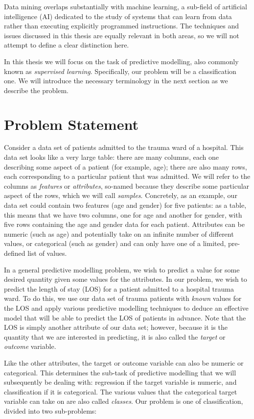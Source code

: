 Data mining overlaps substantially with machine learning, a sub-field of
artificial intelligence (AI) dedicated to the study of systems that can learn
from data rather than executing explicitly programmed instructions. The
techniques and issues discussed in this thesis are equally relevant in both
areas, so we will not attempt to define a clear distinction here.

In this thesis we will focus on the task of predictive modelling, also
commonly known as \textit{supervised learning}. Specifically,
our problem will be a classification one. We will introduce the necessary
terminology in the next section as we describe the problem.

\section{Problem Statement}
Consider a data set of patients admitted to the trauma ward of a hospital.
This data set looks like a very large table: there are many columns, each one
describing some aspect of a patient (for example, age); there are also many
rows, each corresponding to a particular patient that was admitted. We will
refer to the columns as \textit{features} or \textit{attributes}, so-named
because they describe some particular aspect of the rows, which we will call
\textit{samples}. Concretely, as an example, our data set could contain
two features (age and gender) for five patients: as a table, this means that
we have two columns, one for age and another for gender, with five rows
containing the age and gender data for each patient. Attributes can be numeric
(such as age) and potentially take on an infinite number of different values,
or categorical (such as gender) and can only have one of a limited, pre-defined
list of values.

In a general predictive modelling problem, we wish to predict a value for some
desired quantity given some values for the attributes. In our problem, we wish
to predict the length of stay (LOS) for a patient admitted to a hospital trauma
ward. To do this, we use our data set of trauma patients with \textit{known}
values for the LOS and apply various predictive modelling techniques to deduce
an effective model that will be able to predict the LOS of patients in advance.
Note that the LOS is simply another attribute of our data set; however, because
it is the quantity that we are interested in predicting, it is also called the
\textit{target} or \textit{outcome} variable.

Like the other attributes, the target or outcome variable can also be numeric
or categorical. This determines the sub-task of predictive modelling that we
will subsequently be dealing with: regression if the target variable is
numeric, and classification if it is categorical. The various values that the
categorical target variable can take on are also called \textit{classes}.
Our problem is one of classification, divided into two sub-problems:

